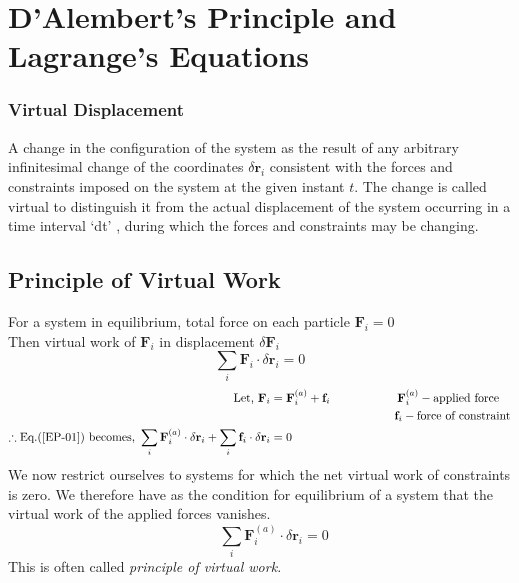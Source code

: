\section{D'Alembert's Principle and Lagrange's Equations}
\subsubsection{Virtual Displacement}
A change in the configuration of the system as the result of any arbitrary infinitesimal change of the coordinates $\delta \textbf{r}_i$ consistent with the forces and constraints imposed on the system at the given instant $t$. The change is called virtual to distinguish it from the actual displacement of the system occurring in a time interval `dt' , during which the forces and constraints may be changing.
\subsection{Principle of Virtual Work}
For a system in equilibrium, total force on each particle  $\textbf{F}_i=0$\\
Then virtual work of $\textbf{F}_i$ in displacement $\delta \textbf{F}_i$
\begin{equation}
\sum\limits_{i}\textbf{F}_i\cdot\delta \textbf{r}_i=0\label{EP-01}
\end{equation}
\begin{align*}
\text{Let, } \textbf{F}_i&=\textbf{F}_i^{(a)}+\textbf{f}_i\hspace{2cm}\textbf{F}_i^{(a)}- \text{applied force}\\
&\hspace{3.7cm}\textbf{f}_i - \text{force of constraint}\\
\therefore \text{Eq.(\ref{EP-01}) becomes, } \sum_{i} \mathbf{F}_{i}^{(a)} \cdot \delta \mathbf{r}_{i}+\sum_{i} \mathbf{f}_{i} \cdot \delta \mathbf{r}_{i}&=0 \\
\end{align*}
 We now restrict ourselves to systems for which the net virtual work of constraints is zero. We therefore have as the condition for equilibrium of a system that the virtual work of the applied forces vanishes.
\begin{equation}
\qquad\sum_{i} \mathbf{F}_{i}^{(a)} \cdot \delta \mathbf{r}_{i}=0\label{EP-02}
\end{equation}
This is often called \textit{principle of virtual work.}
